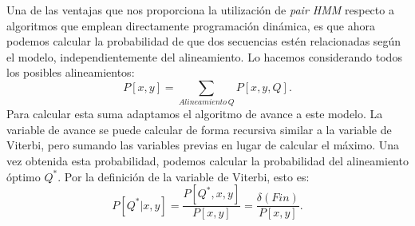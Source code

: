 Una de las ventajas que nos proporciona la utilización de \textit{pair HMM} respecto a algoritmos que emplean directamente programación dinámica, es que ahora podemos calcular la probabilidad de que dos secuencias estén relacionadas según el modelo, independientemente del alineamiento. Lo hacemos considerando todos los posibles alineamientos:
\[P[x,y]=\sum_{Alineamiento\, Q}P[x,y,Q].\]
Para calcular esta suma adaptamos el algoritmo de avance a este modelo. La variable de avance se puede calcular de forma recursiva similar a la variable de Viterbi, pero sumando las variables previas en lugar de calcular el máximo. Una vez obtenida esta probabilidad, podemos calcular la probabilidad del alineamiento óptimo $Q^*$. Por la definición de la variable de Viterbi, esto es:
\[P[Q^*|x,y]=\dfrac{P[Q^*, x,y]}{P[x,y]}=\dfrac{\delta(Fin)}{P[x,y]}.\]

